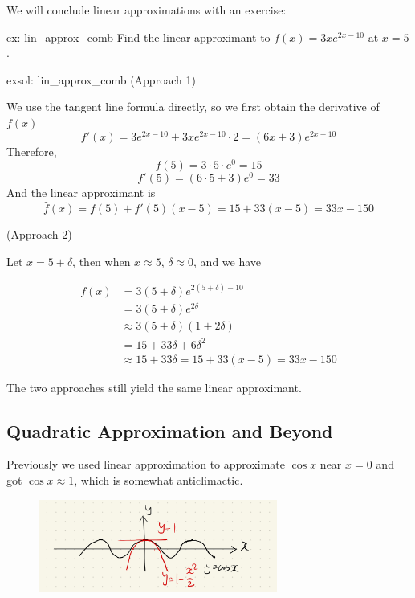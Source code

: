 We will conclude linear approximations with an exercise:

\begin{ex}[]{ex: lin_approx_comb}
    Find the linear approximant to $f(x) = 3xe^{2x-10}$ at $x = 5$.
\end{ex}

\begin{exsol}[]{exsol: lin_approx_comb}
    (Approach 1) 
    
    We use the tangent line formula directly, so we first obtain the derivative of $f(x)$ 
    \[f'(x) = 3e^{2x-10} + 3xe^{2x-10}\cdot 2 = (6x+3)e^{2x-10}\]
    Therefore,
    \[f(5) = 3 \cdot 5 \cdot e^0 = 15\]
    \[f'(5) = (6 \cdot 5+3)e^0 = 33\]
    And the linear approximant is
    \[\hat{f}(x) = f(5) + f'(5)(x-5) = 15 + 33(x-5) = 33x-150\]
    
    (Approach 2)
    
    Let $x = 5 + \delta$, then when $x \approx 5$, $\delta \approx 0$, and we have
    
    \begin{align*}
        f(x) &= 3(5+\delta)e^{2(5+\delta)-10}\\
        &=3(5+\delta)e^{2\delta}\\
        &\approx3(5+\delta)(1+2\delta)\\
        &=15+33\delta+6\delta^2\\
        &\approx 15+33\delta = 15+33(x-5) = 33x-150
    \end{align*}
    
    The two approaches still yield the same linear approximant.
\end{exsol}

\subsection{Quadratic Approximation and Beyond}
Previously we used linear approximation to approximate $\cos x$ near $x=0$ and got $\cos x \approx 1$, which is somewhat anticlimactic.

\begin{figure}[ht]
    \centering
    \includegraphics[width = 0.7\textwidth]{figures/chap 05/qua_approx_cos.png}
    \label{fig: qua_approx_cos}
\end{figure}

